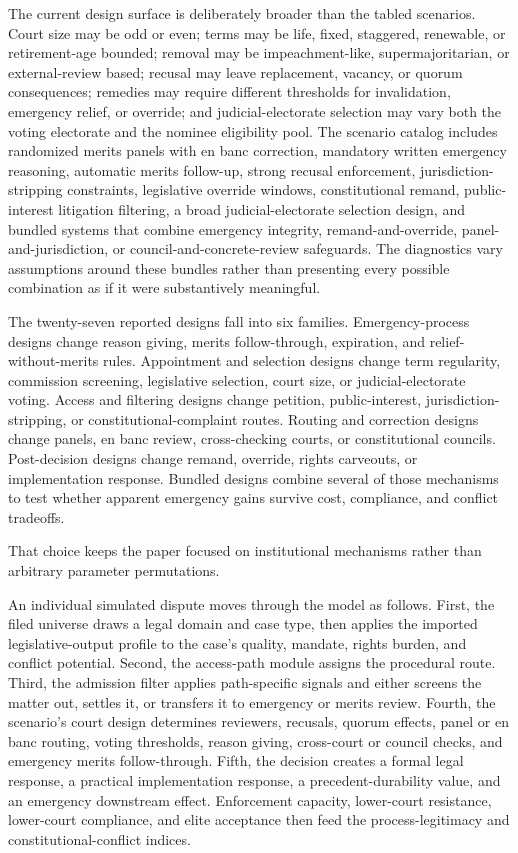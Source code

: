 \documentclass[
    journal=jlc,
    manuscript=research-article,
    year=2026,
  ]{cup-journal}
\begin{document}
The current design surface is deliberately broader than the tabled scenarios. Court size may be odd or even; terms may be life, fixed, staggered, renewable, or retirement-age bounded; removal may be impeachment-like, supermajoritarian, or external-review based; recusal may leave replacement, vacancy, or quorum consequences; remedies may require different thresholds for invalidation, emergency relief, or override; and judicial-electorate selection may vary both the voting electorate and the nominee eligibility pool. The scenario catalog includes randomized merits panels with en banc correction, mandatory written emergency reasoning, automatic merits follow-up, strong recusal enforcement, jurisdiction-stripping constraints, legislative override windows, constitutional remand, public-interest litigation filtering, a broad judicial-electorate selection design, and bundled systems that combine emergency integrity, remand-and-override, panel-and-jurisdiction, or council-and-concrete-review safeguards. The diagnostics vary assumptions around these bundles rather than presenting every possible combination as if it were substantively meaningful.

The twenty-seven reported designs fall into six families. Emergency-process designs change reason giving, merits follow-through, expiration, and relief-without-merits rules. Appointment and selection designs change term regularity, commission screening, legislative selection, court size, or judicial-electorate voting. Access and filtering designs change petition, public-interest, jurisdiction-stripping, or constitutional-complaint routes. Routing and correction designs change panels, en banc review, cross-checking courts, or constitutional councils. Post-decision designs change remand, override, rights carveouts, or implementation response. Bundled designs combine several of those mechanisms to test whether apparent emergency gains survive cost, compliance, and conflict tradeoffs.

That choice keeps the paper focused on institutional mechanisms rather than arbitrary parameter permutations.

An individual simulated dispute moves through the model as follows. First, the filed universe draws a legal domain and case type, then applies the imported legislative-output profile to the case's quality, mandate, rights burden, and conflict potential. Second, the access-path module assigns the procedural route. Third, the admission filter applies path-specific signals and either screens the matter out, settles it, or transfers it to emergency or merits review. Fourth, the scenario's court design determines reviewers, recusals, quorum effects, panel or en banc routing, voting thresholds, reason giving, cross-court or council checks, and emergency merits follow-through. Fifth, the decision creates a formal legal response, a practical implementation response, a precedent-durability value, and an emergency downstream effect. Enforcement capacity, lower-court resistance, lower-court compliance, and elite acceptance then feed the process-legitimacy and constitutional-conflict indices.
\end{document}
